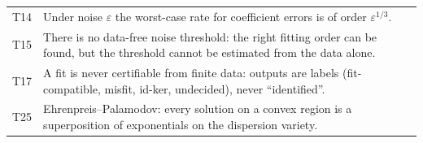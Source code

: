 \documentclass[11pt,a4paper]{article}
\theoremstyle{definition}
\begin{document}
\begin{center}
\begin{tabular}{@{}L{1.0cm}L{12.0cm}@{}}
T14 & Under noise $\varepsilon$ the worst-case rate for coefficient errors is of order $\varepsilon^{1/3}$.\\
T15 & There is no data-free noise threshold: the right fitting order can be found, but the threshold cannot be estimated from the data alone.\\
T17 & A fit is never certifiable from finite data: outputs are labels (fit-compatible, misfit, id-ker, undecided), never ``identified''.\\
T25 & Ehrenpreis--Palamodov: every solution on a convex region is a superposition of exponentials on the dispersion variety.\\
\bottomrule
\end{tabular}
\end{center}

\end{document}
